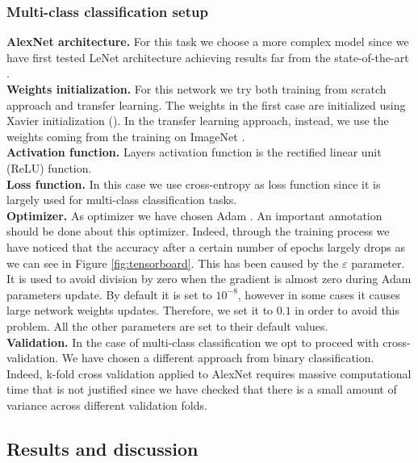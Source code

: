\subsubsection{Multi-class classification setup}
\textbf{AlexNet architecture.}
For this task we choose a more complex model since we have first tested LeNet architecture achieving results far from the state-of-the-art \cite{ref11}.
\\
\textbf{Weights initialization.}
For this network we try both training from scratch approach and transfer learning. The weights in the first case are initialized using Xavier initialization (\cite{ref31}). In the transfer learning approach, instead, we use the weights coming from the training on ImageNet \cite{imagenet}.
\\
\textbf{Activation function.}
Layers activation function is the rectified linear unit (ReLU) function.
\\
\textbf{Loss function.}
In this case we use cross-entropy as loss function since it is largely used for multi-class classification tasks.
\\
\textbf{Optimizer.}
As optimizer we have chosen Adam \cite{ref32}. An important annotation should be done about this optimizer. Indeed, through the training process we have noticed that the accuracy after a certain number of epochs largely drops as we can see in Figure \ref{fig:tensorboard}. This has been caused by the $\varepsilon$ parameter. It is used to avoid division by zero when the gradient is almost zero during Adam parameters update. By default it is set to $10^{-8}$, however in some cases it causes large network weights updates. Therefore, we set it to $0.1$ in order to avoid this problem. All the other parameters are set to their default values.
\\
\textbf{Validation.}
In the case of multi-class classification we opt to proceed with cross-validation. We have chosen a different approach from binary classification. Indeed, k-fold cross validation applied to AlexNet requires massive computational time that is not justified since we have checked that there is a small amount of variance across different validation folds.
\subsection{Results and discussion}
